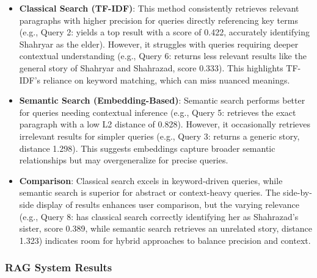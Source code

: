 \documentclass[12pt]{article}
\begin{document}
\begin{itemize}
    \item \textbf{Classical Search (TF-IDF)}: This method consistently retrieves relevant paragraphs with higher precision for queries directly referencing key terms (e.g., Query 2: \arabicfont {} yields a top result with a score of 0.422, accurately identifying Shahryar as the elder). However, it struggles with queries requiring deeper contextual understanding (e.g., Query 6: \arabicfont {} returns less relevant results like the general story of Shahryar and Shahrazad, score 0.333). This highlights TF-IDF's reliance on keyword matching, which can miss nuanced meanings.

    \item \textbf{Semantic Search (Embedding-Based)}: Semantic search performs better for queries needing contextual inference (e.g., Query 5: \arabicfont {} retrieves the exact paragraph with a low L2 distance of 0.828). However, it occasionally retrieves irrelevant results for simpler queries (e.g., Query 3: \arabicfont {} returns a generic story, distance 1.298). This suggests embeddings capture broader semantic relationships but may overgeneralize for precise queries.

    \item \textbf{Comparison}: Classical search excels in keyword-driven queries, while semantic search is superior for abstract or context-heavy queries. The side-by-side display of results enhances user comparison, but the varying relevance (e.g., Query 8: \arabicfont {} has classical search correctly identifying her as Shahrazad’s sister, score 0.389, while semantic search retrieves an unrelated story, distance 1.323) indicates room for hybrid approaches to balance precision and context.
\end{itemize}



\subsubsection{RAG System Results}
\end{document}
